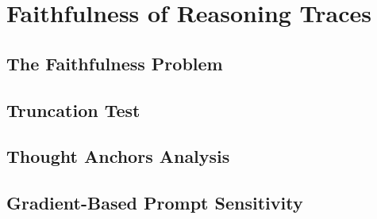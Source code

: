 \section{Faithfulness of Reasoning Traces}

\subsection{The Faithfulness Problem}

\subsection{Truncation Test}

\subsection{Thought Anchors Analysis}

\subsection{Gradient-Based Prompt Sensitivity}

